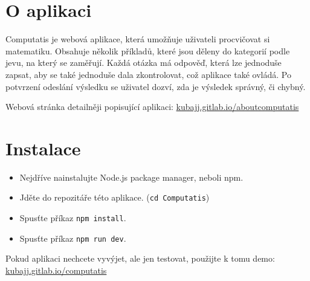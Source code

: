 \documentclass[
]{article}
\date{}
\begin{document}

\tableofcontents
\newpage

\section{O aplikaci}
Computatis je webová aplikace, která umožňuje uživateli procvičovat si matematiku.
Obsahuje několik příkladů, které jsou děleny do kategorií podle jevu, na který se zaměřují.
Každá otázka má odpověď, která lze jednoduše zapsat, aby se také jednoduše dala zkontrolovat,
což aplikace také ovládá. Po potvrzení odeslání výsledku se uživatel dozví, zda je výsledek správný, či chybný.

Webová stránka detailněji popisující aplikaci: 
\href{https://kubajj.gitlab.io/aboutcomputatis}{kubajj.gitlab.io/aboutcomputatis}

\section{Instalace}
\begin{itemize}
\item Nejdříve nainstalujte Node.js package manager, neboli npm.
\item Jděte do repozitáře této aplikace. (\texttt{cd\ Computatis})
\item Spusťte příkaz \texttt{npm\ install}.
\item Spusťte příkaz \texttt{npm\ run\ dev}.
\end{itemize}
Pokud aplikaci nechcete vyvýjet, ale jen testovat, použijte k tomu demo:
\href{https://kubajj.gitlab.io/computatis}{kubajj.gitlab.io/computatis}
\end{document}
